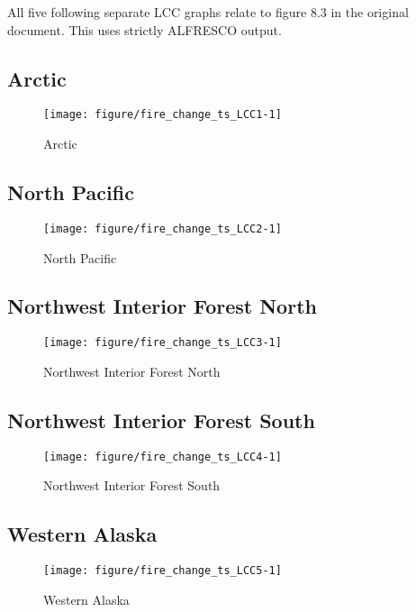 \documentclass{article}\usepackage[]{graphicx}\usepackage[]{color}
\makeatletter
\def\maxwidth{ %
  \ifdim\Gin@nat@width>\linewidth
    \linewidth
  \else
    \Gin@nat@width
  \fi
}
\makeatother
\begin{document}
All five following separate LCC graphs relate to figure 8.3 in the original document.
This uses strictly ALFRESCO output.
\subsection{Arctic}
\begin{figure}[H]
\texttt{[image: figure/fire\_change\_ts\_LCC1-1]} \caption[Arctic]{Arctic\label{fig:fire_change_ts_LCC1}}
\end{figure}



\subsection{North Pacific}
\begin{figure}[H]
\texttt{[image: figure/fire\_change\_ts\_LCC2-1]} \caption[North Pacific]{North Pacific\label{fig:fire_change_ts_LCC2}}
\end{figure}



\subsection{Northwest Interior Forest North}
\begin{figure}[H]
\texttt{[image: figure/fire\_change\_ts\_LCC3-1]} \caption[Northwest Interior Forest North]{Northwest Interior Forest North\label{fig:fire_change_ts_LCC3}}
\end{figure}



\subsection{Northwest Interior Forest South}
\begin{figure}[H]
\texttt{[image: figure/fire\_change\_ts\_LCC4-1]} \caption[Northwest Interior Forest South]{Northwest Interior Forest South\label{fig:fire_change_ts_LCC4}}
\end{figure}



\subsection{Western Alaska}
\begin{figure}[H]
\texttt{[image: figure/fire\_change\_ts\_LCC5-1]} \caption[Western Alaska]{Western Alaska\label{fig:fire_change_ts_LCC5}}
\end{figure}
\end{document}
